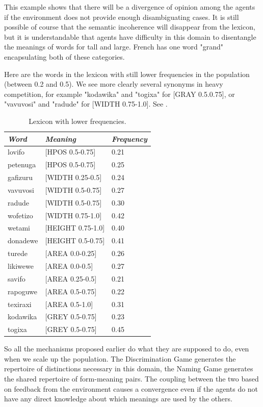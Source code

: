 This example shows that there will be a divergence of 
opinion among the agents if the environment does not 
provide enough 
disambiguating cases. It is still possible of course that 
the semantic incoherence will disappear from the lexicon, 
but it is understandable that agents have difficulty 
in this domain to disentangle the meanings of words for 
tall and large. French has one word "grand" encapsulating
both of these categories.

Here are the words in the lexicon with still lower 
frequencies in the population (between 0.2 and 0.5). We see
more clearly several synonyms in heavy competition, for example 
"kodawika" and "togixa" for [GRAY 0.5.0.75], or 
"vavuvosi" and "radude" for [WIDTH 0.75-1.0]. See . 
\begin{table}
\begin{center}
\begin{tabular}{ l  l  l } \hline
{\it Word}&{\it Meaning} & {\it Frequency} \\ \hline
lovifo & [HPOS 0.5-0.75] & 0.21 \\ \hline
petenuga & [HPOS 0.5-0.75] & 0.25 \\ \hline
gafizuru & [WIDTH 0.25-0.5] & 0.24 \\ \hline
vavuvosi & [WIDTH 0.5-0.75] & 0.27 \\ \hline
radude & [WIDTH 0.5-0.75] & 0.30 \\ \hline
wofetizo & [WIDTH 0.75-1.0] & 0.42 \\ \hline
wetami & [HEIGHT 0.75-1.0] & 0.40 \\ \hline
donadewe & [HEIGHT 0.5-0.75] & 0.41 \\ \hline
turede & [AREA 0.0-0.25] & 0.26 \\ \hline
likiwewe & [AREA 0.0-0.5] & 0.27 \\ \hline
savifo & [AREA 0.25-0.5] & 0.21 \\ \hline
rapoguwe & [AREA 0.5-0.75] & 0.22 \\ \hline
texiraxi & [AREA 0.5-1.0] & 0.31 \\ \hline
kodawika & [GREY 0.5-0.75] & 0.23 \\ \hline
togixa & [GREY 0.5-0.75] & 0.45 \\ \hline
\end{tabular}
\caption{\label{tab:comp} Lexicon with lower frequencies.}
\end{center}
\end{table}

So all the mechanisms proposed earlier 
do what they are supposed to do, even when we 
scale up the population. The Discrimination 
Game generates the repertoire of distinctions 
necessary in this domain, the Naming Game generates
the shared repertoire of form-meaning pairs. The 
coupling between the two based on feedback from 
the environment causes a convergence even if the
agents do not have any direct knowledge about 
which meanings are used by the others. 

